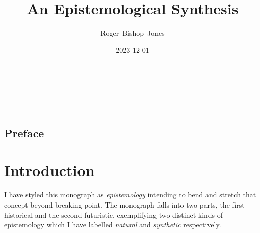\documentclass[10pt,titlepage]{book}
\title{\bf An Epistemological Synthesis}
\author{Roger~Bishop~Jones}
\date{\small 2023-12-01}
\newcommand{\ignore}[1]{}
\begin{document}
% 
% 
% 
                             
\begin{titlepage}
\maketitle





\end{titlepage}

\ \

\ignore{
\begin{centering}
{}
\end{centering}
}%

\setcounter{tocdepth}{2}
{\parskip-0pt\tableofcontents}


\hfill
\ 
\pagebreak







\section*{Preface}

\chapter{Introduction}

I have styled this monograph as \emph{epistemology} intending to bend and stretch that concept beyond breaking point.
The monograph falls into two parts, the first historical and the second futuristic, exemplifying two distinct kinds of epistemology which I have labelled \emph{natural} and \emph{synthetic} respectively.
\end{document}
